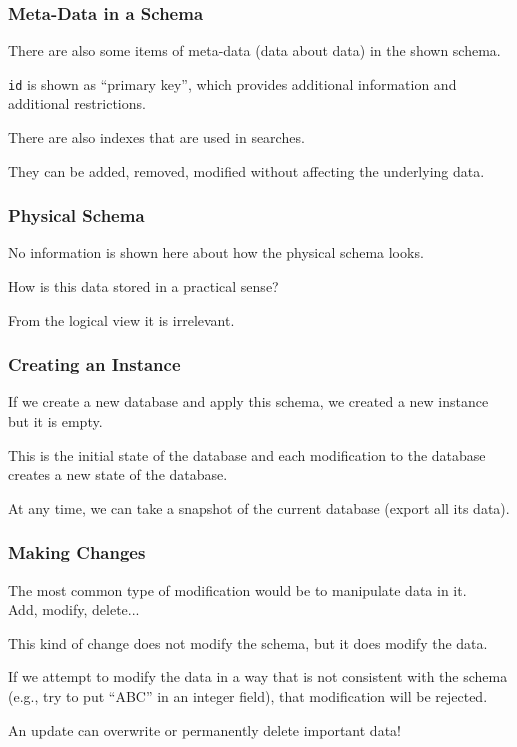 \begin{frame}
\frametitle{Meta-Data in a Schema}

There are also some items of meta-data (data about data) in the shown schema.

\texttt{id} is shown as ``primary key'', which provides additional information and additional restrictions.

There are also indexes that are used in searches. 

They can be added, removed, modified without affecting the underlying data.


\end{frame}



\begin{frame}
\frametitle{Physical Schema}

No information is shown here about how the physical schema looks. 

How is this data stored in a practical sense? 

From the logical view it is irrelevant.

\end{frame}



\begin{frame}
\frametitle{Creating an Instance}

If we create a new database and apply this schema, we created a new instance but it is empty. 

This is the initial state of the database and each modification to the database creates a new state of the database.

At any time, we can take a snapshot of the current database (export all its data). 

\end{frame}



\begin{frame}
\frametitle{Making Changes}

The most common type of modification would be to manipulate data in it.\\
\quad Add, modify, delete...

This kind of change does not modify the schema, but it does modify the data.

If we attempt to modify the data in a way that is not consistent with the schema (e.g., try to put ``ABC'' in an integer field), that modification will be rejected.

An update can overwrite or permanently delete important data!

\end{frame}



